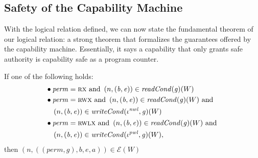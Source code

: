 \documentclass[format=acmsmall, review=true, screen=true]{acmart}
\newcommand{\var}[1]{\mathit{#1}}
\newcommand{\gl}{\var{g}}
\newcommand{\addr}{\var{a}}
\newcommand{\start}{\var{b}}
\newcommand{\addrend}{\var{e}}
\newcommand{\perm}{\var{perm}}
\newcommand{\nwl}{\var{nwl}}
\newcommand{\pwl}{\var{pwl}}
\newcommand{\plainfun}[2]{
  \ifthenelse{\equal{#2}{}}
  {\mathit{#1}}
  {\mathit{#1}(#2)}
}
\newcommand{\readCond}[1]{\plainfun{readCond}{#1}}
\newcommand{\writeCond}[1]{\plainfun{writeCond}{#1}}
\newcommand{\asmType}{\plaindom{AsmType}}
\newcommand{\plaindom}[1]{\mathrm{#1}}
\newcommand{\intr}[2]{\mathcal{#1}}
\newcommand{\exprintr}[1]{\intr{E}{#1}}
\newcommand{\stder}{\exprintr{\asmType}}
\newcommand{\npair}[2][n]{\left(#1,#2 \right)}
\newcommand{\plainperm}[1]{\textsc{#1}}
\newcommand{\exec}{\plainperm{rx}}
\newcommand{\rwx}{\plainperm{rwx}}
\newcommand{\rwlx}{\plainperm{rwlx}}
\begin{document}
\subsection{Safety of the Capability Machine}
With the logical relation defined, we can now state the fundamental theorem of
our logical relation: a strong theorem that formalizes the guarantees offered by
the capability machine. Essentially, it says a capability that only grants safe
authority is capability safe as a program counter.
\begin{theorem}
  \label{thm:ftlr}
  If one of the following holds:
  \begin{align*}
      & \bullet
        \begin{aligned}[t]
        &\perm = \exec \text{ and }\npair{(\start,\addrend)} \in \readCond{}(\gl)(W)
      \end{aligned} \\
    & \bullet 
      \begin{aligned}[t]
        &\perm = \rwx \text{ and } \npair{(\start,\addrend)} \in \readCond{}(\gl)(W) \text{ and }\\
        &\npair{(\start,\addrend)} \in \writeCond{}(\iota^\nwl,\gl)(W)
      \end{aligned} \\
    & \bullet 
      \begin{aligned}[t]
        &\perm = \rwlx \text{ and }\npair{(\start,\addrend)} \in \readCond{}(\gl)(W) \text{ and }\\
        &\npair{(\start,\addrend)} \in \writeCond{}(\iota^\pwl,\gl)(W),
      \end{aligned}
  \end{align*}
  then $\npair{((\perm,\gl),\start,\addrend,\addr)} \in \stder(W)$
\end{theorem}
\end{document}
